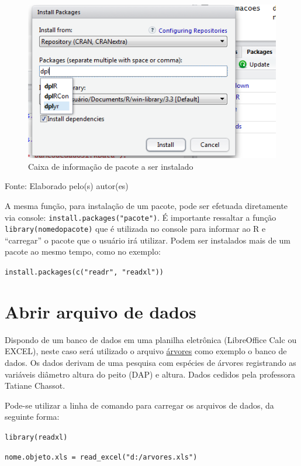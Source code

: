 \documentclass[12pt,brazil,oneside]{book}
\begin{document}
\begin{figure}[H]

{\centering \includegraphics[width=0.8\linewidth]{pacotes2} 

}

\caption{Caixa de informação de pacote a ser instalado}\label{fig:pacotes2}
\end{figure}

Fonte: Elaborado pelo(s) autor(es)

A mesma função, para instalação de um pacote, pode ser efetuada diretamente via console: \texttt{install.packages("pacote")}. É importante ressaltar a função \texttt{library(nomedopacote)} que é utilizada no console para informar ao R e ``carregar'' o pacote que o usuário irá utilizar. Podem ser instalados mais de um pacote ao mesmo tempo, como no exemplo:

\texttt{install.packages(c("readr",\ "readxl"))}

\hypertarget{abrir-arquivo-de-dados}{%
\section{Abrir arquivo de dados}\label{abrir-arquivo-de-dados}}

Dispondo de um banco de dados em uma planilha eletrônica (LibreOffice Calc ou EXCEL), neste caso será utilizado o arquivo \href{https://github.com/Smolski/softwarelivrer/raw/master/basico/arvores.xlsx}{árvores} como exemplo o banco de dados. Os dados derivam de uma pesquisa com espécies de árvores registrando as variáveis diâmetro altura do peito (DAP) e altura. Dados cedidos pela professora Tatiane Chassot.

Pode-se utilizar a linha de comando para carregar os arquivos de dados, da seguinte forma:

\texttt{library(readxl)}

\texttt{nome.objeto.xls\ =\ read\_excel("d:/arvores.xls")}
\end{document}
